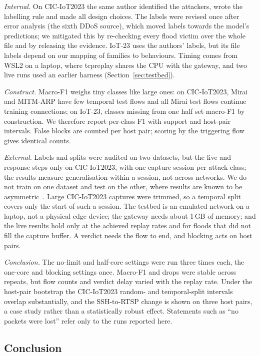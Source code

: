 \emph{Internal.} On CIC-IoT2023 the same author identified the attackers, wrote the labelling rule and made all design choices. The labels were revised once after error analysis (the sixth DDoS source), which moved labels towards the model's predictions; we mitigated this by re-checking every flood victim over the whole file and by releasing the evidence. IoT-23 uses the authors' labels, but its file labels depend on our mapping of families to behaviours. Timing comes from WSL2 on a laptop, where tcpreplay shares the CPU with the gateway, and two live runs used an earlier harness (Section~\ref{sec:testbed}).

\emph{Construct.} Macro-F1 weighs tiny classes like large ones: on CIC-IoT2023, Mirai and MITM-ARP have few temporal test flows and all Mirai test flows continue training connections; on IoT-23, classes missing from one half set macro-F1 by construction. We therefore report per-class F1 with support and host-pair intervals. False blocks are counted per host pair; scoring by the triggering flow gives identical counts.

\emph{External.} Labels and splits were audited on two datasets, but the live and response steps only on CIC-IoT2023, with one capture session per attack class; the results measure generalisation within a session, not across networks. We do not train on one dataset and test on the other, where results are known to be asymmetric~\cite{ali2026siamxbert}. Large CIC-IoT2023 captures were trimmed, so a temporal split covers only the start of such a session. The testbed is an emulated network on a laptop, not a physical edge device; the gateway needs about 1\,GB of memory; and the live results hold only at the achieved replay rates and for floods that did not fill the capture buffer. A verdict needs the flow to end, and blocking acts on host pairs.

\emph{Conclusion.} The no-limit and half-core settings were run three times each, the one-core and blocking settings once. Macro-F1 and drops were stable across repeats, but flow counts and verdict delay varied with the replay rate. Under the host-pair bootstrap the CIC-IoT2023 random- and temporal-split intervals overlap substantially, and the SSH-to-RTSP change is shown on three host pairs, a case study rather than a statistically robust effect. Statements such as ``no packets were lost'' refer only to the runs reported here.

\subsection{Conclusion}

